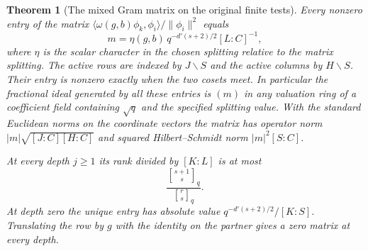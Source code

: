 \documentclass[a4paper,11pt]{article}
\newtheorem{theorem}[proposition]{Theorem}
\theoremstyle{definition}
\theoremstyle{remark}
\numberwithin{equation}{section}
\begin{document}
\begin{theorem}[The mixed Gram matrix on the original finite tests]\leavevmode\label{thm:pintable340}
Every nonzero entry of the matrix
$\langle\omega(g,b)\phi_k,\phi_i\rangle/\|\phi_i\|^2$ equals
\[
             m=\eta(g,b)\,q^{-d'(s+2)/2}[L:C]^{-1} ,
\]
where $\eta$ is the scalar character in the chosen splitting relative
to the matrix splitting. The active rows are indexed by $J\backslash S$
and the active columns by $H\backslash S$. Their entry is nonzero
exactly when the two cosets meet. In particular the fractional ideal
generated by all these entries is $(m)$ in any valuation ring of a
coefficient field containing $\sqrt q$ and the specified splitting value.
With the standard Euclidean norms on the coordinate vectors the matrix
has operator norm $|m|\sqrt{[J:C][H:C]}$ and squared Hilbert--Schmidt
norm $|m|^2[S:C]$.

At every depth $j\ge1$ its rank divided by $[K:L]$ is at most
\[
          \frac{{s+1\brack s}_q}{{r\brack s}_q} .
\]
At depth zero the unique entry has absolute value
$q^{-d'(s+2)/2}/[K:S]$. Translating the row by $g$ with the identity
on the partner gives a zero matrix at every depth.
\end{theorem}
\end{document}
